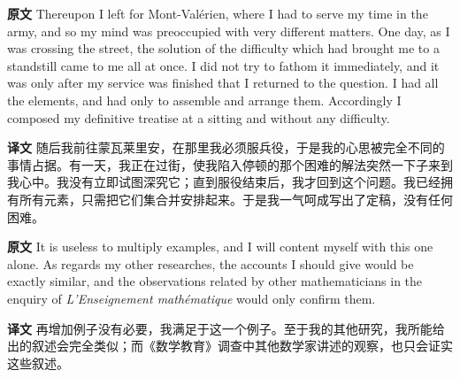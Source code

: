 \documentclass[UTF8]{ctexart}
\newenvironment{english}{\par\small\noindent\textbf{原文}\quad\ignorespaces}{\par}
\newenvironment{zhtranslation}{\par\noindent\textbf{译文}\quad\ignorespaces}{\par\vspace{0.35em}}
\begin{document}
\begin{english}
Thereupon I left for Mont-Valérien, where I had to serve my time in the army, and so my mind was preoccupied with very different matters. One day, as I was crossing the street, the solution of the difficulty which had brought me to a standstill came to me all at once. I did not try to fathom it immediately, and it was only after my service was finished that I returned to the question. I had all the elements, and had only to assemble and arrange them. Accordingly I composed my definitive treatise at a sitting and without any difficulty.
\end{english}
\begin{zhtranslation}
随后我前往蒙瓦莱里安，在那里我必须服兵役，于是我的心思被完全不同的事情占据。有一天，我正在过街，使我陷入停顿的那个困难的解法突然一下子来到我心中。我没有立即试图深究它；直到服役结束后，我才回到这个问题。我已经拥有所有元素，只需把它们集合并安排起来。于是我一气呵成写出了定稿，没有任何困难。\end{zhtranslation}

\begin{english}
It is useless to multiply examples, and I will content myself with this one alone. As regards my other researches, the accounts I should give would be exactly similar, and the observations related by other mathematicians in the enquiry of \emph{L'Enseignement mathématique} would only confirm them.
\end{english}
\begin{zhtranslation}
再增加例子没有必要，我满足于这一个例子。至于我的其他研究，我所能给出的叙述会完全类似；而《数学教育》调查中其他数学家讲述的观察，也只会证实这些叙述。\end{zhtranslation}
\end{document}
